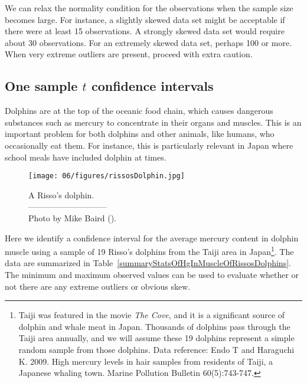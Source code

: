 We can relax the normality condition for the observations when the sample size becomes large. For instance, a slightly skewed data set might be acceptable if there were at least 15 observations. A strongly skewed data set would require about 30 observations. For an extremely skewed data set, perhaps 100 or more. When very extreme outliers are present, proceed with extra caution.


\subsection{One sample $t$ confidence intervals}
\label{oneSampleTConfidenceIntervals}

Dolphins are at the top of the oceanic food chain, which causes dangerous substances such as mercury to concentrate in their organs and muscles. This is an important problem for both dolphins and other animals, like humans, who occasionally eat them. For instance, this is particularly relevant in Japan where school meals have included dolphin at times.
\setlength{\captionwidth}{71.5mm}

\begin{figure}[h]
\centering
\texttt{[image: 06/figures/rissosDolphin.jpg]}  \\
\addvspace{2mm}
\begin{minipage}{\textwidth}
   \caption[rissosDolphinPic]{A Risso's dolphin.\vspace{-1mm} \\
   -----------------------------\vspace{-2mm}\\
   {\footnotesize Photo by Mike Baird ().%
}\vspace{-8mm}}
   \label{rissosDolphin}
\end{minipage}
\vspace{3mm}
\end{figure}
\setlength{\captionwidth}{\mycaptionwidth}

Here we identify a confidence interval for the average mercury content in dolphin muscle using a sample of 19 Risso's dolphins from the Taiji area in Japan\footnote{Taiji was featured in the movie \emph{The Cove}, and it is a significant source of dolphin and whale meat in Japan. Thousands of dolphins pass through the Taiji area annually, and we will assume these 19 dolphins represent a simple random sample from those dolphins. Data reference: Endo T and Haraguchi K. 2009. High mercury levels in hair samples from residents of Taiji, a Japanese whaling town. Marine Pollution Bulletin 60(5):743-747.}. The data are summarized in Table~\ref{summaryStatsOfHgInMuscleOfRissosDolphins}. The minimum and maximum observed values can be used to evaluate whether or not there are any extreme outliers or obvious skew.

